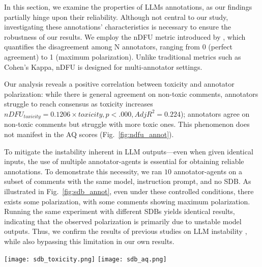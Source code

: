 In this section, we examine the properties of \acp{LLM} annotations, as our findings partially hinge upon their reliability. Although not central to our study, investigating these annotations' characteristics is necessary to ensure the robustness of our results. We employ the \ac{nDFU} metric introduced by \citet{pavlopoulos-likas-2024-polarized}, which quantifies the disagreement among N annotators, ranging from 0 (perfect agreement) to 1 (maximum polarization). Unlike traditional metrics such as Cohen's Kappa, \ac{nDFU} is designed for multi-annotator settings. 

Our analysis reveals a positive correlation between toxicity and annotator polarization: while there is general agreement on non-toxic comments, annotators struggle to reach consensus as toxicity increases $nDFU_{toxicity} = 0.1206 \times toxicity, p < .000, Adj R^2=0.224$); annotators agree on non-toxic comments but struggle with more toxic ones. This phenomenon does not manifest in the \ac{AQ} scores (Fig.~\ref{fig:ndfu_annot}). 

To mitigate the instability inherent in \ac{LLM} outputs—even when given identical inputs, the use of multiple annotator-agents is essential for obtaining reliable annotations. To demonstrate this necessity, we ran $10$ annotator-agents on a subset of comments with the same model, instruction prompt, and no \ac{SDB}. As illustrated in Fig.~\ref{fig:sdb_annot}, even under these controlled conditions, there exists some polarization, with some comments showing maximum polarization. Running the same experiment with different \acp{SDB} yields identical results, indicating that the observed polarization is primarily due to unstable model outputs. Thus, we confirm the results of previous studies on \ac{LLM} instability \cite{rossi_2024, atil_2025}, while also bypassing this limitation in our own results.


\begin{figure*}[t]
    \texttt{[image: sdb\_toxicity.png]} \hfill
    \texttt{[image: sdb\_aq.png]}
	\centering
	\caption{Distribution plot of inter-annotator polarization (\ac{nDFU}) for each comment in all synthetic discussions following the "No Instructions" strategy and using the Qwen 2.5 model. The blue (left-most) bars represent the disagreement between $10$ identical annotator-agents, while the orange (right-most) bars, the disagreement between $10$ annotators with different \acp{SDB}.}
    \label{fig:sdb_annot}
\end{figure*}

